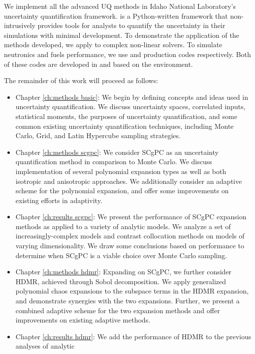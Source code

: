 We implement all the advanced UQ methods in Idaho National Laboratory's \raven{} \cite{raven}
uncertainty quantification framework. \raven{} is a Python-written framework that non-intrusively provides
tools for analysts to quantify the uncertainty in their simulations with minimal development.  To demonstrate
the application of the methods developed, we apply \raven{} to complex non-linear solvers.
To simulate neutronics and fuels performance, we use \rattlesnake{} \cite{rattlesnake} and 
\bison{} \cite{bison,mammoth} production codes respectively.
Both of these codes are developed in and based on the \moose{} \cite{moose} environment.

The remainder of this work will proceed as follows:
\begin{itemize}
  \item Chapter \ref{ch:methods basic}: We begin by defining concepts and ideas used in uncertainty
    quantification.  We discuss uncertainty spaces, correlated inputs, statistical moments, the purposes of
    uncertainty quantification, and some common existing uncertainty quantification techniques, including
    Monte Carlo, Grid, and Latin Hypercube sampling strategies.
  \item Chapter \ref{ch:methods scgpc}: We consider SCgPC as an uncertainty
    quantification method in comparison to Monte Carlo.  We discuss implementation of several polynomial
    expansion types as well as both isotropic and anisotropic approaches.  We additionally consider an
    adaptive scheme for the polynomial expansion, and offer some improvements on existing efforts in
    adaptivity.
  \item Chapter \ref{ch:results scgpc}: We present the performance of SCgPC
    expansion methods as applied to a variety of analytic models.  We analyze a set of increasingly-complex
    models and contrast collocation methods on models of varying dimensionality.  We draw some conclusions
    based on performance to determine when SCgPC is a viable choice over Monte Carlo sampling.
  \item Chapter \ref{ch:methods hdmr}: Expanding on SCgPC, we further consider
    HDMR, achieved through Sobol decomposition.  We apply generalized polynomial
    chaos expansions to the subspace terms in the HDMR expansion, and demonstrate
    synergies with the two expansions.  Further, we present a combined adaptive scheme for the two expansion
    methods and offer improvements on existing adaptive methods.
  \item Chapter \ref{ch:results hdmr}: We add the performance of HDMR to the previous analyses of analytic

\end{itemize}
